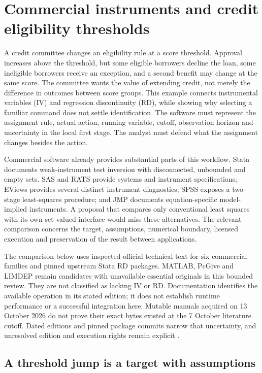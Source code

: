 \section{Commercial instruments and credit eligibility thresholds}
\label{exec13:commercial-iv-rd}

A credit committee changes an eligibility rule at a score threshold. Approval
increases above the threshold, but some eligible borrowers decline the loan,
some ineligible borrowers receive an exception, and a second benefit may
change at the same score. The committee wants the value of extending credit,
not merely the difference in outcomes between score groups. This example
connects instrumental variables (IV) and regression discontinuity (RD), while
showing why selecting a familiar command does not settle identification.
The software must represent the assignment rule, actual action, running
variable, cutoff, observation horizon and uncertainty in the local first
stage. The analyst must defend what the assignment changes besides the action.

Commercial software already provides substantial parts of this workflow.
Stata documents weak-instrument test inversion with disconnected, unbounded
and empty sets. SAS and RATS provide systems and instrument specifications;
EViews provides several distinct instrument diagnostics; SPSS exposes a
two-stage least-squares procedure; and JMP documents equation-specific
model-implied instruments. A proposal that compares only conventional least
squares with its own set-valued interface would miss these alternatives.
The relevant comparison concerns the target, assumptions, numerical boundary,
licensed execution and preservation of the result between applications.

The comparison below uses inspected official technical text for six commercial
families and pinned upstream Stata RD packages. MATLAB, PcGive and LIMDEP
remain candidates with unavailable essential originals in this bounded
review. They are not classified as lacking IV or RD. Documentation identifies
the available operation in its stated edition; it does not establish runtime
performance or a successful integration here. Mutable manuals acquired on
13 October 2026 do not prove their exact bytes existed at the 7 October
literature cutoff. Dated editions and pinned package commits narrow that
uncertainty, and unresolved edition and execution rights remain explicit
\citep{exec13_ivrd_survey}.

\subsection{A threshold jump is a target with assumptions}

